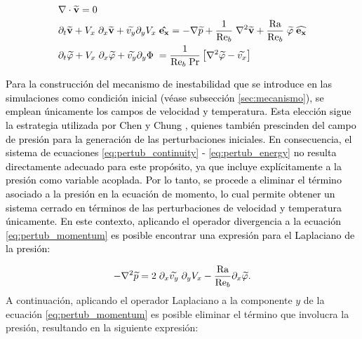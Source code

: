 \begin{align}
&\nabla \cdot \mathbf{\widetilde{v}} = 0
\label{eq:pertub_continuity} \\
&\partial_t \mathbf{\widetilde{v}} + V_x \hspace{1mm} \partial_x \mathbf{\widetilde{v}} + {\widetilde{v_y}} \partial_y V_x \hspace{1mm} \mathbf{\hat{e_x}} = - \nabla \widetilde{p} + \frac{1}{\text{Re}_b} \hspace{1mm} \nabla^2 \mathbf{\widetilde{v}} + \frac{\text{Ra}}{\text{Re}_b} \hspace{1mm} \widetilde{\varphi} \hspace{1mm}  \mathbf{\widehat{e_x}} 
\label{eq:pertub_momentum} \\
&\partial_t {\widetilde{\varphi}} + V_x \hspace{1mm} \partial_x {\widetilde{\varphi}} + {\widetilde{v_y}} \partial_y \Phi \hspace{1mm} = \frac{1}{\text{Re}_b \hspace{1mm} \text{Pr}} \left[ \nabla^2 \widetilde{\varphi} - \widetilde{v_x} \right]
\label{eq:pertub_energy} 
\end{align} 


\textcolor{black}{Para la construcción del mecanismo de inestabilidad  que se introduce en las simulaciones como condición inicial (véase subsección \ref{sec:mecanismo}), se emplean únicamente los campos de velocidad y temperatura. Esta elección sigue la estrategia utilizada por Chen y Chung \cite{chen2003direct}, quienes también prescinden del campo de presión para la generación de las perturbaciones iniciales. En consecuencia, el sistema de ecuaciones \ref{eq:pertub_continuity} - \ref{eq:pertub_energy} no resulta directamente adecuado para este propósito, ya que incluye explícitamente a la presión como variable acoplada. Por lo tanto, se procede a eliminar el término asociado a la presión en la ecuación de momento, lo cual permite obtener un sistema cerrado en términos de las perturbaciones de velocidad y temperatura únicamente. En este contexto, aplicando el operador divergencia a la ecuación \ref{eq:pertub_momentum} es posible encontrar una expresión para el Laplaciano de la presión:}

\begin{equation}
- \nabla^2 \widetilde{p} = 2 \hspace{1mm} \partial_x \widetilde{v_y} \hspace{1mm} \partial_y V_x - \frac{\text{Ra}}{\text{Re}_b} \partial_x \widetilde{\varphi} \text{.}
\label{eq:pressure_eigen}
\end{equation}
A continuación, aplicando el operador Laplaciano a la componente $y$ de la ecuación \ref{eq:pertub_momentum} es posible eliminar el término que involucra la presión, resultando en la siguiente expresión:

